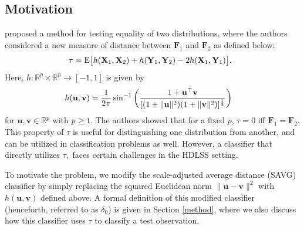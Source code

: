 \documentclass[twoside]{article}
\newcommand{\bX}{\mathbf{X}}
\newcommand{\bY}{\mathbf{Y}}
\newcommand{\bF}{\mathbf{F}}
\newcommand{\bu}{\mathbf{u}}
\newcommand{\bv}{\mathbf{v}}
\newcommand{\0}{\mathbf{0}}
\newcommand{\1}{\mathbf{1}}
\numberwithin{equation}{section}
\begin{document}
\subsection{Motivation}\label{intro.motiv}
\cite{li2020projective} proposed a method for testing equality of two distributions, where the authors considered a new measure of distance between $\bF_1$ and $\bF_2$ as defined below:
\begin{align*}
\hspace{-0.45cm} \tau = {\rm E}\big [ h(\bX_1,\bX_2) +  h(\bY_1,\bY_2) - 2 h(\bX_1,\bY_1)\big ].\hspace{-0.25cm}
\end{align*}
Here, $h:\mathbb{R}^p\times \mathbb{R}^p\to [-1,1]$ is given by
\begin{align*}
\hspace{-0.33cm}h(\bu,\bv)=\frac{1}{2\pi}\sin^{-1}\left(\frac{1+\bu^\top\bv}{[(1+\|\bu\|^2)(1+\|\bv\|^2)]^\frac{1}{2}}\right )
\end{align*}
for $\bu,\bv\in\mathbb{R}^p$ with $p\geq 1.$ The authors showed that for a fixed $p$, $\tau=0$ iff $\bF_1=\bF_2$. This property of $\tau$ is useful for distinguishing one distribution from another, and can be utilized in classification problems as well. However, a classifier that directly utilizes $\tau,$ faces certain challenges in the HDLSS setting.

\noindent To motivate the problem, we modify the scale-adjusted average distance (SAVG) classifier \citep{CH2009} by simply replacing the squared Euclidean norm $\|\bu-\bv\|^2$ with $h(\bu,\bv)$ defined above. A formal definition of this modified classifier (henceforth, referred to as $\delta_0$) is given in Section \ref{method}, where we also  discuss how this classifier uses $\tau$ to classify a test observation. %
\end{document}
